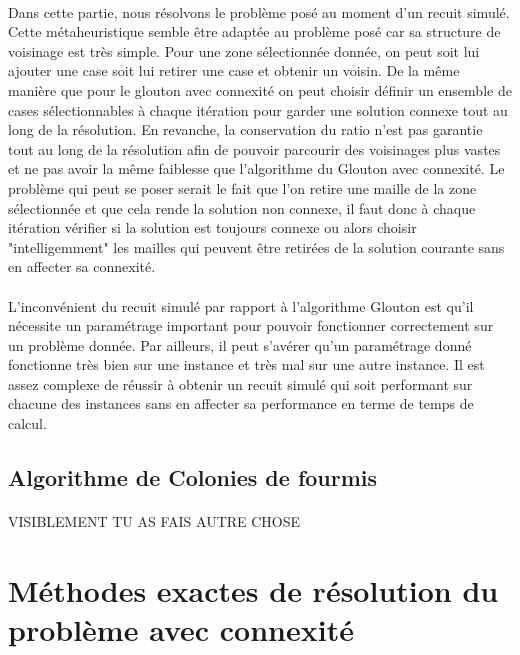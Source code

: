 \documentclass[a4paper, 11pt]{article} %
\begin{document}
\paragraph{}
Dans cette partie, nous résolvons le problème posé au moment d'un recuit simulé. Cette métaheuristique semble être adaptée au problème posé car sa structure de voisinage est très simple. Pour une zone sélectionnée donnée, on peut soit lui ajouter une case soit lui retirer une case et obtenir un voisin. De la même manière que pour le glouton avec connexité on peut choisir définir un ensemble de cases sélectionnables à chaque itération pour garder une solution connexe tout au long de la résolution. En revanche, la conservation du ratio n'est pas garantie tout au long de la résolution afin de pouvoir parcourir des voisinages plus vastes et ne pas avoir la même faiblesse que l'algorithme du Glouton avec connexité. Le problème qui peut se poser serait le fait que l'on retire une maille de la zone sélectionnée et que cela rende la solution non connexe, il faut donc à chaque itération vérifier si la solution est toujours connexe ou alors choisir "intelligemment" les mailles qui peuvent être retirées de la solution courante sans en affecter sa connexité.

\paragraph*{}
L'inconvénient du recuit simulé par rapport à l'algorithme Glouton est qu'il nécessite un paramétrage important pour pouvoir fonctionner correctement sur un problème donnée. Par ailleurs, il peut s'avérer qu'un paramétrage donné fonctionne très bien sur une instance et très mal sur une autre instance. Il est assez complexe de réussir à obtenir un recuit simulé qui soit performant sur chacune des instances sans en affecter sa performance en terme de temps de calcul.


\subsection{Algorithme de Colonies de fourmis}

\paragraph*{}
VISIBLEMENT TU AS FAIS AUTRE CHOSE

\section{Méthodes exactes de résolution du problème avec connexité}
\end{document}
